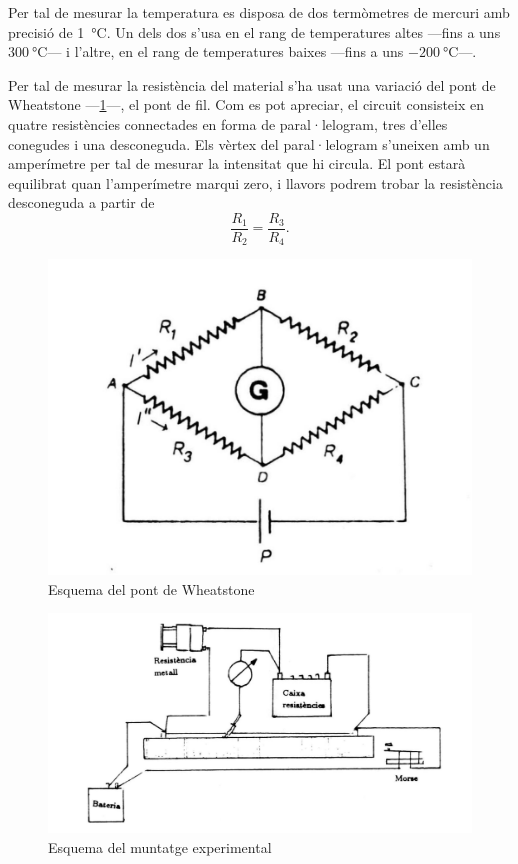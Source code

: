 Per tal de mesurar la temperatura es disposa de dos termòmetres de mercuri amb precisió de \SI{1}{\celsius}. Un dels dos s'usa en el rang de temperatures altes ---fins a uns $\SI{300}{\celsius}$--- i l'altre, en el rang de temperatures baixes ---fins a uns $ \SI{-200}{\celsius}$---.

Per tal de mesurar la resistència del material s'ha usat una variació del pont de Wheatstone ---\ref{fig:wheatstone}---, el pont de fil. Com es pot apreciar, el circuit consisteix en quatre resistències connectades en forma de paral·lelogram, tres d'elles conegudes i una desconeguda. Els vèrtex del paral·lelogram s'uneixen amb un amperímetre per tal de mesurar la intensitat que hi circula. El pont estarà equilibrat quan l'amperímetre marqui zero, i llavors podrem trobar la resistència desconeguda a partir de
\begin{equation*}
\frac{R_1}{R_2}=\frac{R_3}{R_4}.
\end{equation*}

\begin{figure}[htb]
	\centering
	\includegraphics[scale=0.4]{pont.png}
	\caption{Esquema del pont de Wheatstone}
	\label{fig:wheatstone}
\end{figure}

\begin{figure}[htb]
	\centering
	\includegraphics[scale=0.4]{muntatge.png}
	\caption{Esquema del muntatge experimental}
	\label{fig:muntatge resistencia}
\end{figure}

